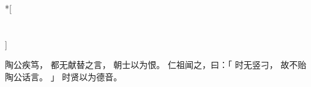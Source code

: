 
\switchcolumn[0]*[\section{}]

陶公疾笃，
都无献替之言，
朝士以为恨。
仁祖闻之，曰：「
    时无竖刁，
    故不贻陶公话言。
」
时贤以为德音。

\switchcolumn


